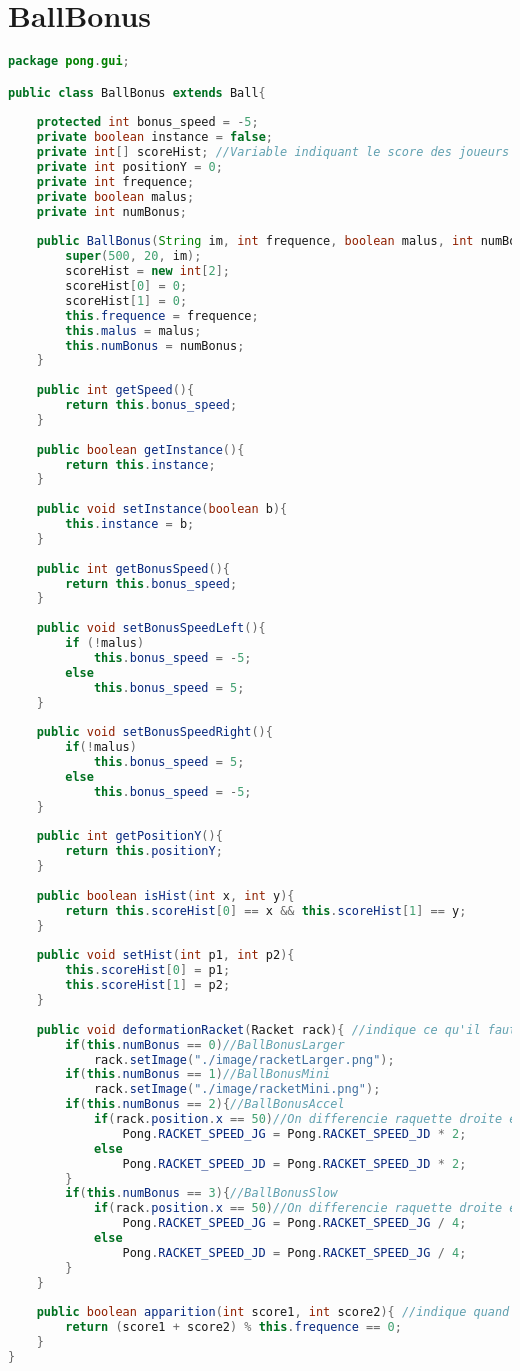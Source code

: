 \section{BallBonus}
\begin{lstlisting}[language=Java]
package pong.gui;

public class BallBonus extends Ball{
	
	protected int bonus_speed = -5;
	private boolean instance = false;
	private int[] scoreHist; //Variable indiquant le score des joueurs au moment ou une BallBonus est cree 
	private int positionY = 0;
	private int frequence;
	private boolean malus;
	private int numBonus;
	
	public BallBonus(String im, int frequence, boolean malus, int numBonus){
		super(500, 20, im); 
		scoreHist = new int[2];
		scoreHist[0] = 0;
		scoreHist[1] = 0;
		this.frequence = frequence;
		this.malus = malus;
		this.numBonus = numBonus;
	}
	
	public int getSpeed(){
		return this.bonus_speed;
	}
	
	public boolean getInstance(){
		return this.instance;
	}
	
	public void setInstance(boolean b){
		this.instance = b;
	}
	
	public int getBonusSpeed(){
		return this.bonus_speed;
	}
	
	public void setBonusSpeedLeft(){
		if (!malus)
			this.bonus_speed = -5;
		else
			this.bonus_speed = 5;
	}
	
	public void setBonusSpeedRight(){
		if(!malus)
			this.bonus_speed = 5;
		else
			this.bonus_speed = -5;
	}
	
	public int getPositionY(){
		return this.positionY;
	}
	
	public boolean isHist(int x, int y){
		return this.scoreHist[0] == x && this.scoreHist[1] == y;
	}
	
	public void setHist(int p1, int p2){
		this.scoreHist[0] = p1;
		this.scoreHist[1] = p2;
	}
	
	public void deformationRacket(Racket rack){ //indique ce qu'il faut faire a la raquette lorqu'elle entre en collision avec le bonus
		if(this.numBonus == 0)//BallBonusLarger
			rack.setImage("./image/racketLarger.png");
		if(this.numBonus == 1)//BallBonusMini
			rack.setImage("./image/racketMini.png");
		if(this.numBonus == 2){//BallBonusAccel
			if(rack.position.x == 50)//On differencie raquette droite et gauche 
				Pong.RACKET_SPEED_JG = Pong.RACKET_SPEED_JD * 2;
			else
				Pong.RACKET_SPEED_JD = Pong.RACKET_SPEED_JD * 2;
		}
		if(this.numBonus == 3){//BallBonusSlow
			if(rack.position.x == 50)//On differencie raquette droite et gauche
				Pong.RACKET_SPEED_JG = Pong.RACKET_SPEED_JG / 4;
			else
				Pong.RACKET_SPEED_JD = Pong.RACKET_SPEED_JG / 4;
		}
	}
	
	public boolean apparition(int score1, int score2){ //indique quand apparait la balle bonus
		return (score1 + score2) % this.frequence == 0;
	}
}
\end{lstlisting}